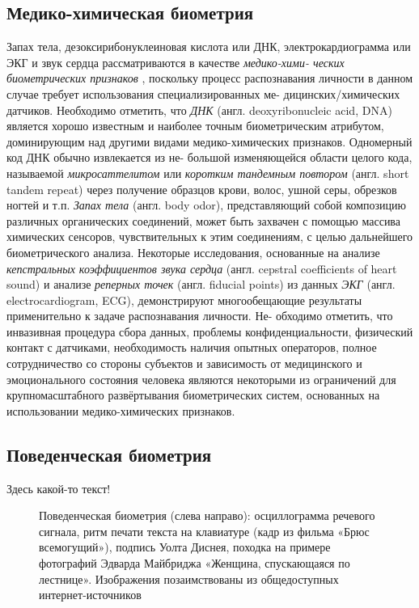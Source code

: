 \documentclass[12pt]{book}
\begin{document}
\subsection{Медико-химическая биометрия}

\large{Запах тела, дезоксирибонуклеиновая кислота или ДНК, электрокардиограмма или ЭКГ и звук сердца рассматриваются в качестве \textit{медико-хими- ческих биометрических признаков} \cite{unar_2014}, поскольку процесс распознавания личности в данном случае требует использования специализированных ме- дицинских/химических датчиков. Необходимо отметить, что \textit{ДНК} (англ. deoxyribonucleic acid, DNA) является хорошо известным и наиболее точным биометрическим атрибутом, доминирующим над другими видами медико-химических признаков. Одномерный код ДНК обычно извлекается из не- большой изменяющейся области целого кода, называемой \textit{микросаттелитом} или \textit{коротким тандемным повтором} (англ. short tandem repeat) через получение образцов крови, волос, ушной серы, обрезков ногтей и т.п. \textit{Запах тела} (англ. body odor), представляющий собой композицию различных органических соединений, может быть захвачен с помощью массива химических сенсоров, чувствительных к этим соединениям, с целью дальнейшего биометрического анализа. Некоторые исследования, основанные на анализе \textit{кепстральных коэффициентов звука сердца} (англ. cepstral coefficients of heart sound) и анализе \textit{реперных точек} (англ. fiducial points) из данных \textit{ЭКГ} (англ. electrocardiogram, ECG), демонстрируют многообещающие результаты применительно к задаче распознавания личности. Не- обходимо отметить, что инвазивная процедура сбора данных, проблемы конфиденциальности, физический контакт с датчиками, необходимость наличия опытных операторов, полное сотрудничество со стороны субъектов и зависимость от медицинского и эмоционального состояния человека являются некоторыми из ограничений для крупномасштабного развёртывания биометрических систем, основанных на использовании медико-химических признаков.}

\subsection{Поведенческая биометрия}

\large{Здесь какой-то текст!}

\begin{figure}[h]
\caption{Поведенческая биометрия (слева направо): осциллограмма речевого сигнала, ритм печати текста на клавиатуре (кадр из фильма «Брюс всемогущий»), подпись Уолта Диснея, походка на примере фотографий Эдварда Майбриджа «Женщина, спускающаяся по лестнице». Изображения позаимствованы из общедоступных интернет-источников}
\label{fig:figure_1_5}
\end{figure}
\end{document}
